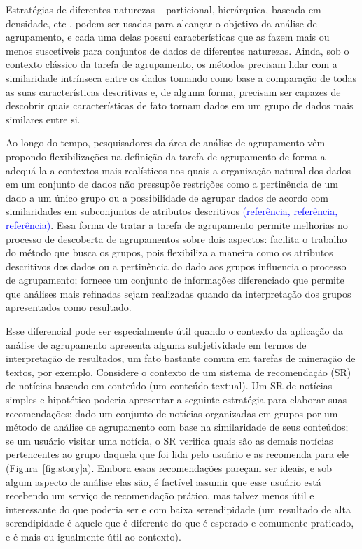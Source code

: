 \documentclass[
    12pt,                %
    oneside,            %
    a4paper,            %
    english,            %
    brazil                %
    ]{abntex2ppgsi}
\begin{document}
Estratégias de diferentes naturezas -- particional, hierárquica, baseada em densidade, etc \cite{Xu2005, han2006data}, podem ser usadas para alcançar o objetivo da análise de agrupamento, e cada uma delas possui características que as fazem mais ou menos suscetiveis para conjuntos de dados de diferentes naturezas. Ainda, sob o contexto clássico da tarefa de agrupamento, os métodos precisam lidar com a similaridade intrínseca entre os dados tomando como base a comparação de todas as suas características descritivas e, de alguma forma, precisam ser capazes de descobrir quais características de fato tornam dados em um grupo de dados mais similares entre si.

Ao longo do tempo, pesquisadores da área de análise de agrupamento vêm propondo flexibilizações na definição da tarefa de agrupamento de forma a adequá-la a contextos mais realísticos nos quais a organização natural dos dados em um conjunto de dados não pressupõe restrições como a pertinência de um dado a um único grupo ou a possibilidade de agrupar dados de acordo com similaridades em subconjuntos de atributos descritivos \textcolor{blue}{(referência, referência, referência)}. Essa forma de tratar a tarefa de agrupamento permite melhorias no processo de descoberta de agrupamentos sobre dois aspectos: facilita o trabalho do método que busca os grupos, pois flexibiliza a maneira como os atributos descritivos dos dados ou a pertinência do dado aos grupos influencia o processo de agrupamento; fornece um conjunto de informações diferenciado que permite que análises mais refinadas sejam realizadas quando da interpretação dos grupos apresentados como resultado.

Esse diferencial pode ser especialmente útil quando o contexto da aplicação da análise de agrupamento apresenta alguma subjetividade em termos de interpretação de resultados, um fato bastante comum em tarefas de mineração de textos, por exemplo. Considere o contexto de um sistema de recomendação (SR) de notícias baseado em conteúdo (um conteúdo textual). Um SR de notícias simples e hipotético poderia apresentar a seguinte estratégia para elaborar suas recomendações: dado um conjunto de notícias organizadas em grupos por um método de análise de agrupamento com base na similaridade de seus conteúdos; se um usuário visitar uma notícia, o SR verifica quais são as demais notícias pertencentes ao grupo daquela que foi lida pelo usuário e as recomenda para ele (Figura~\ref{fig:story}a). Embora essas recomendações pareçam ser ideais, e sob algum aspecto de análise elas são, é factível assumir que esse usuário está recebendo um serviço de recomendação prático, mas talvez menos útil e interessante do que poderia ser e com baixa serendipidade (um resultado de alta serendipidade é aquele que é diferente do que é esperado e comumente praticado, e é mais ou igualmente útil ao contexto).
\end{document}
